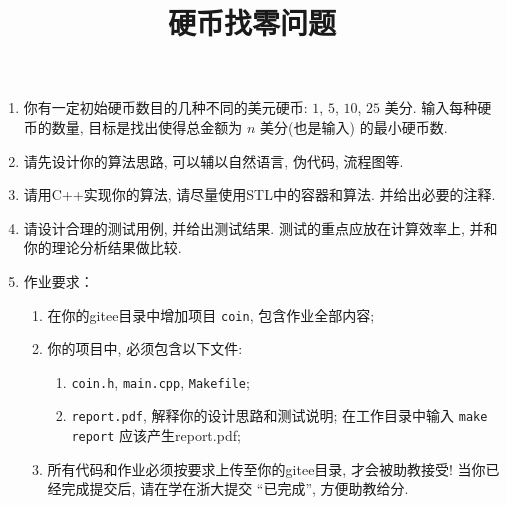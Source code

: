 \documentclass[a4paper,12pt]{article}
\begin{document}
\title{\hei 硬币找零问题}


\maketitle


\begin{enumerate}
\item 你有一定初始硬币数目的几种不同的美元硬币: $1$, $5$, $10$, $25$ 美分. 
输入每种硬币的数量, 目标是找出使得总金额为 $n$ 美分(也是输入) 的最小硬币数. 
\item 请先设计你的算法思路, 可以辅以自然语言, 伪代码, 流程图等.
\item 请用C++实现你的算法, 请尽量使用STL中的容器和算法. 并给出必要的注释.
\item 请设计合理的测试用例, 并给出测试结果. 测试的重点应放在计算效率上, 并和你的理论分析结果做比较.
\item 作业要求：
\begin{enumerate}
\item 在你的gitee目录中增加项目 \verb|coin|, 包含作业全部内容;
\item 你的项目中, 必须包含以下文件:
\begin{enumerate}
\item \verb|coin.h|, \verb|main.cpp|, \verb|Makefile|;
\item \verb|report.pdf|, 解释你的设计思路和测试说明; 在工作目录中输入 
\verb|make report| 应该产生report.pdf;
\end{enumerate}
\item {\hei 所有代码和作业必须按要求上传至你的gitee目录, 才会被助教接受! 
当你已经完成提交后, 请在学在浙大提交 ``已完成'', 方便助教给分. }
\end{enumerate}
\end{enumerate}



\end{document}
